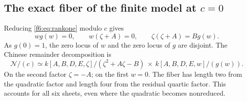 \documentclass[11pt,a4paper]{article}
\theoremstyle{definition}
\newcommand{\normal}{\mathcal N}
\begin{document}
\subsection{The exact fiber of the finite model at \texorpdfstring{$c=0$}{c=0}}
Reducing \eqref{f6:eq:rankone} modulo $c$ gives
\[
 wg(w)=0,\qquad w(\zeta+A)=0,\qquad
 \zeta(\zeta+A)=Bg(w).
\]
As $g(0)=1$, the zero locus of $w$ and the zero locus of $g$ are disjoint.
The Chinese remainder decomposition is
\begin{equation}\label{f6:eq:CRT}
 \normal/(c)\simeq
 k[A,B,D,E,\zeta]/(\zeta^2+A\zeta-B)
 \ \times\ k[A,B,D,E,w]/(g(w)).
\end{equation}
On the second factor $\zeta=-A$; on the first $w=0$.
The fiber has length two from the quadratic factor and length four from
the residual quartic factor. This accounts for all six sheets, even where
the quadratic becomes nonreduced.
\end{document}
